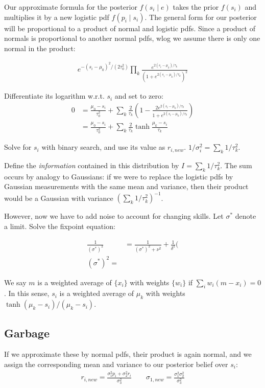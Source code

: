 \documentclass{article}
\begin{document}
Our approximate formula for the posterior $f(s_i \mid e)$ takes the prior $f(s_i)$ and multiplies it by a new logistic pdf $f(p_i\mid s_i)$. The general form for our posterior will be proportional to a product of normal and logistic pdfs. Since a product of normals is proportional to another normal pdfs, wlog we assume there is only one normal in the product:

\begin{align}
e^{-(s_i-\mu_0)^2/(2\tau_0^2)} \prod_k \frac { e^{2(s_i-\mu_k)/\tau_k} } { \left(1 + e^{2(s_i-\mu_k)/\tau_k} \right)^2 }
\end{align}

Differentiate its logarithm w.r.t. $s_i$ and set to zero:
\begin{align}
0 &= \frac{\mu_0-s_i}{\tau_0^2} + \sum_k \frac{2}{\tau_k}\left( 1 - \frac {2e^{2(s_i-\mu_k)/\tau_k}} {1 + e^{2(s_i-\mu_k)/\tau_k}} \right)
\\ &=  \frac{\mu_0-s_i}{\tau_0^2} + \sum_k \frac{2}{\tau_k} \tanh \frac {\mu_k-s_i} {\tau_k}
\end{align}

Solve for $s_i$ with binary search, and use its value as $r_{i,new}$. $1/\sigma_i^2 = \sum_k 1/\tau_k^2$.

Define the \emph{information} contained in this distribution by $I = \sum_k 1/\tau_k^2$. The sum occurs by analogy to Gaussians: if we were to replace the logistic pdfs by Gaussian measurements with the same mean and variance, then their product would be a Gaussian with variance $(\sum_k 1/\tau_k^2)^{-1}$.

However, now we have to add noise to account for changing skills. Let $\sigma^*$ denote a limit. Solve the fixpoint equation:

\begin{align}
\frac{1}{(\sigma^*)^2} &= \frac{1}{(\sigma^*)^2+\nu^2} + \frac{1}{\delta^2}(
\\(\sigma^*)^2 = 
\end{align}

We say $m$ is a weighted average of $\{x_i\}$ with weights $\{w_i\}$ if $\sum_i w_i(m-x_i) = 0$. In this sense, $s_i$ is a weighted average of $\mu_k$ with weights $\tanh(\mu_k-s_i) / (\mu_k-s_i)$.

\subsection{Garbage}

If we approximate these by normal pdfs, their product is again normal, and we assign the corresponding mean and variance to our posterior belief over $s_i$:
\begin{align}
r_{i,new} = \frac{\sigma_1^2p_i + \sigma_2^2r_i}{\sigma_3^2} \qquad \sigma_{1,new} = \frac{\sigma_1^2\sigma_2^2}{\sigma_3^2}
\end{align}
\end{document}
